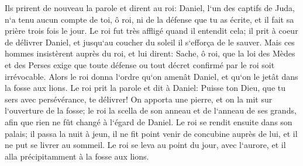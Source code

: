\verse Ils prirent de nouveau la parole et dirent au roi: Daniel, l`un des captifs de Juda, n`a tenu aucun compte de toi, ô roi, ni de la défense que tu as écrite, et il fait sa prière trois fois le jour. 
\verse Le roi fut très affligé quand il entendit cela; il prit à coeur de délivrer Daniel, et jusqu`au coucher du soleil il s`efforça de le sauver. 
\verse Mais ces hommes insistèrent auprès du roi, et lui dirent: Sache, ô roi, que la loi des Mèdes et des Perses exige que toute défense ou tout décret confirmé par le roi soit irrévocable. 
\verse Alors le roi donna l`ordre qu`on amenât Daniel, et qu`on le jetât dans la fosse aux lions. Le roi prit la parole et dit à Daniel: Puisse ton Dieu, que tu sers avec persévérance, te délivrer! 
\verse On apporta une pierre, et on la mit sur l`ouverture de la fosse; le roi la scella de son anneau et de l`anneau de ses grands, afin que rien ne fût changé à l`égard de Daniel. 
\verse Le roi se rendit ensuite dans son palais; il passa la nuit à jeun, il ne fit point venir de concubine auprès de lui, et il ne put se livrer au sommeil. 
\verse Le roi se leva au point du jour, avec l`aurore, et il alla précipitamment à la fosse aux lions. 
